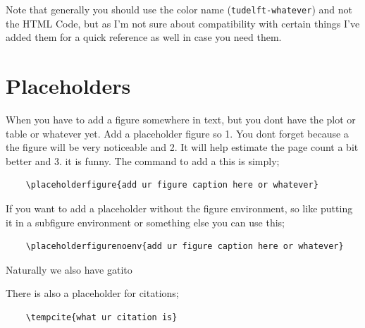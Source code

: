 \documentclass[../main.tex]{subfiles}
\begin{document}
Note that generally you should use the color name (\texttt{tudelft-whatever}) and not the HTML Code, but as I'm not sure about compatibility with certain things I've added them for a quick reference as well in case you need them.

\section{Placeholders}
When you have to add a figure somewhere in text, but you dont have the plot or table or whatever yet. Add a placeholder figure so 1. You dont forget because a the figure will be very noticeable and 2. It will help estimate the page count a bit better and 3. it is funny. 
The command to add a this is simply;
\begin{verbatim}
    \placeholderfigure{add ur figure caption here or whatever}
\end{verbatim}

If you want to add a placeholder without the figure environment, so like putting it in a subfigure environment or something else you can use this;
\begin{verbatim}
    \placeholderfigurenoenv{add ur figure caption here or whatever}
\end{verbatim}

Naturally we also have gatito
\gatito{}

There is also a placeholder for citations;
\begin{verbatim}
    \tempcite{what ur citation is}
\end{verbatim}
\end{document}
